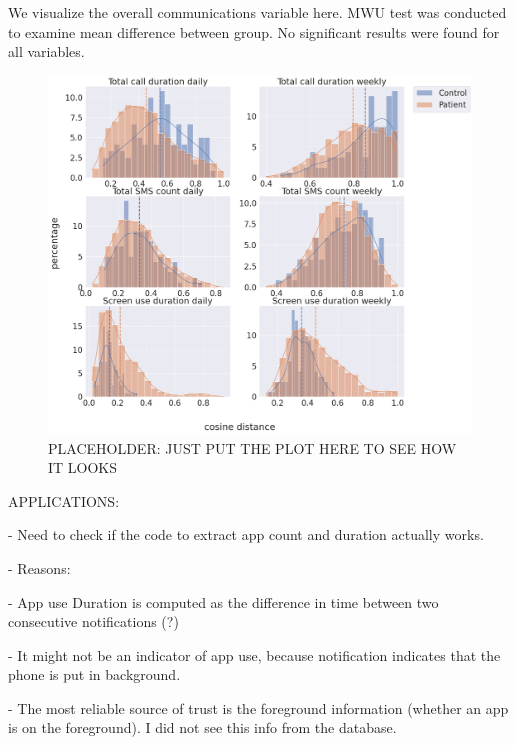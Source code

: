 \documentclass[journal, onecolumn, 11pt]{IEEEtran}
\begin{document}
We visualize the overall communications variable here. MWU test was conducted to examine mean difference between group. No significant results were found for all variables.

\begin{figure}[htbp]
    \centering
    \includegraphics[width=\textwidth]{figs/2_histograms_of_distances.png}
    \caption{PLACEHOLDER: JUST PUT THE PLOT HERE TO SEE HOW IT LOOKS}
\end{figure}

APPLICATIONS:

- Need to check if the code to extract app count and duration actually works. 

- Reasons:

    - App use Duration is computed as the difference in time between two consecutive notifications (?)
    
    - It might not be an indicator of app use, because notification indicates that the phone is put in background.

    - The most reliable source of trust is the foreground information (whether an app is on the foreground). I did not see this info from the database.
\end{document}
